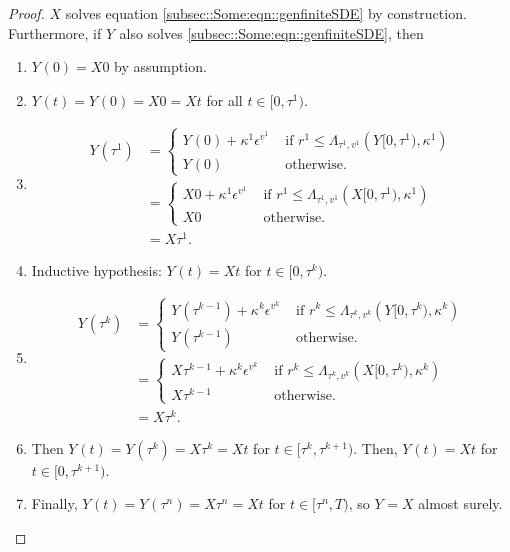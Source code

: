\documentclass[12pt]{article}
\newcommand{\te}{\text}
\newcommand{\ep}{\epsilon}
\renewcommand{\v}{v}							%
\newcommand{\ev}[1]{\ep^{#1}}					%
\newcommand{\T}{T}								%
\renewcommand{\t}{t}							%
\newcommand{\X}{X}								%
\renewcommand{\r}{r}								%
\newcommand{\rt}[1]{\tau^{#1}}						%
\renewcommand{\it}{k}								%
\newcommand{\numb}{n}								%
\newcommand{\rxvtt}[2]{Y_{#1}{(#2)}}				%
\newcommand{\rxvtts}[2]{Y_{#1}{#2}}					%
\newcommand{\ratee}[1]{\Lambda_{#1}}				%
\renewcommand{\mark}[1]{\kappa^{#1}}				%
\begin{document}
\begin{proof}
\(\X{}{}\) solves equation \eqref{subsec::Some:eqn::genfiniteSDE} by construction. Furthermore, if \(\rxvtts{}{}\) also solves \eqref{subsec::Some:eqn::genfiniteSDE}, then 

\begin{enumerate}
\item \(\rxvtt{}{0} = \X{}{0}\) by assumption.

\item \(\rxvtt{}{\t} = \rxvtt{}{0} = \X{}{0} = \X{}{\t}\) for all \(\t\in [0,\rt{1})\).

\item 

\begin{align*}
\rxvtt{}{\rt{1}} &= \begin{cases}
\rxvtt{}{0} + \mark{1}\ev{\v^1} &\te{ if } \r^1 \leq \ratee{\rt{1},\v^1}(\rxvtts{}{[0,\rt{1})},\mark{1})\\
\rxvtt{}{0} &\te{ otherwise.}
\end{cases}\\
&= \begin{cases}
\X{}{0} + \mark{1}\ev{\v^1} &\te{ if } \r^1 \leq \ratee{\rt{1},\v^1}(\X{}{[0,\rt{1})},\mark{1})\\
\X{}{0} &\te{ otherwise.}
\end{cases}\\
&= \X{}{\rt{1}}.
\end{align*}

\item Inductive hypothesis: \(\rxvtt{}{\t} = \X{}{\t}\) for \(\t\in [0,\rt{\it})\). 

\item 

\begin{align*}
\rxvtt{}{\rt{\it}} &= \begin{cases}
\rxvtt{}{\rt{\it-1}} + \mark{\it}\ev{\v^\it} &\te{ if } \r^\it \leq \ratee{\rt{\it},\v^\it}(\rxvtts{}{[0,\rt{\it})},\mark{\it})\\
\rxvtt{}{\rt{\it-1}} &\te{ otherwise.}
\end{cases}\\
&= \begin{cases}
\X{}{\rt{\it-1}} + \mark{\it}\ev{\v^\it} &\te{ if } \r^\it \leq \ratee{\rt{\it},\v^\it}(\X{}{[0,\rt{\it})},\mark{\it})\\
\X{}{\rt{\it-1}} &\te{ otherwise.}
\end{cases}\\
&= \X{}{\rt{\it}}.
\end{align*}

\item Then \(\rxvtt{}{\t} = \rxvtt{}{\rt{\it}} = \X{}{\rt{\it}} = \X{}{\t}\) for \(\t \in [\rt{\it},\rt{\it+1})\). Then, \(\rxvtt{}{\t} = \X{}{\t}\) for \(\t\in [0,\rt{\it+1})\).

\item Finally, \(\rxvtt{}{\t} = \rxvtt{}{\rt{\numb}} = \X{}{\rt{\numb}} = \X{}{\t}\) for \(\t\in [\rt{\numb},\T)\), so \(\rxvtts{}{} = \X{}{}\) almost surely.
\end{enumerate}
\end{proof}
\end{document}
